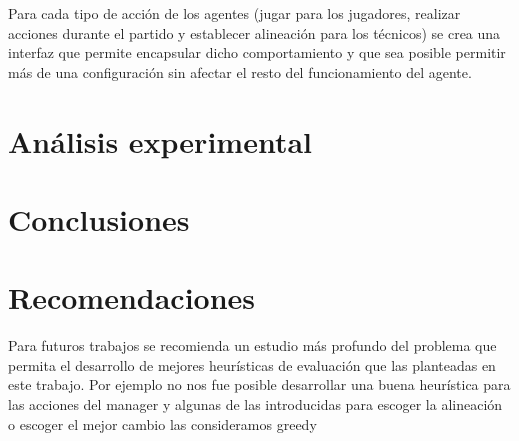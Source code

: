\documentclass{article}
\begin{document}
Para cada tipo de acción de los agentes (jugar para los jugadores, realizar acciones durante el partido y establecer alineación para los
técnicos) se crea una interfaz que permite encapsular dicho comportamiento y que sea posible permitir más de una configuración sin afectar
el resto del funcionamiento del agente.

\section{Análisis experimental}

\section{Conclusiones}

\section{Recomendaciones}

Para futuros trabajos se recomienda un estudio más profundo del problema que permita el desarrollo de mejores heurísticas de evaluación
que las planteadas en este trabajo. Por ejemplo no nos fue posible desarrollar una buena heurística para las acciones del manager y algunas
de las introducidas para escoger la alineación o escoger el mejor cambio las consideramos greedy 
\end{document}
